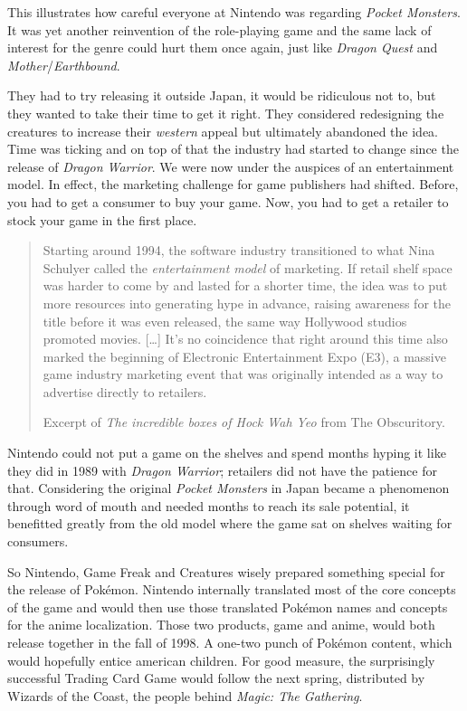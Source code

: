 \documentclass{book}
\begin{document}
This illustrates how careful everyone at Nintendo was regarding \emph{Pocket Monsters}. It was yet another reinvention of the role-playing game and the same lack of interest for the genre could hurt them once again, just like \emph{Dragon Quest} and \emph{Mother}/\emph{Earthbound}.

They had to try releasing it outside Japan, it would be ridiculous not to, but they wanted to take their time to get it right. They considered redesigning the creatures to increase their \emph{western} appeal but ultimately abandoned the idea. Time was ticking and on top of that the industry had started to change since the release of \emph{Dragon Warrior}. We were now under the auspices of an entertainment model. In effect, the marketing challenge for game publishers had shifted. Before, you had to get a consumer to buy your game. Now, you had to get a retailer to stock your game in the first place.

\begin{quote}
Starting around 1994, the software industry transitioned to what Nina Schulyer called the \emph{entertainment model} of marketing. If retail shelf space was harder to come by and lasted for a shorter time, the idea was to put more resources into generating hype in advance, raising awareness for the title before it was even released, the same way Hollywood studios promoted movies. […] It’s no coincidence that right around this time also marked the beginning of Electronic Entertainment Expo (E3), a massive game industry marketing event that was originally intended as a way to advertise directly to retailers.

Excerpt of \emph{The incredible boxes of Hock Wah Yeo} from The Obscuritory.
\end{quote} \par

Nintendo could not put a game on the shelves and spend months hyping it like they did in 1989 with \emph{Dragon Warrior}; retailers did not have the patience for that. Considering the original \emph{Pocket Monsters} in Japan became a phenomenon through word of mouth and needed months to reach its sale potential, it benefitted greatly from the old model where the game sat on shelves waiting for consumers.

So Nintendo, Game Freak and Creatures wisely prepared something special for the release of Pokémon. Nintendo internally translated most of the core concepts of the game and would then use those translated Pokémon names and concepts for the anime localization. Those two products, game and anime, would both release together in the fall of 1998. A one-two punch of Pokémon content, which would hopefully entice american children. For good measure, the surprisingly successful Trading Card Game would follow the next spring, distributed by Wizards of the Coast, the people behind \emph{Magic: The Gathering}.
\end{document}
